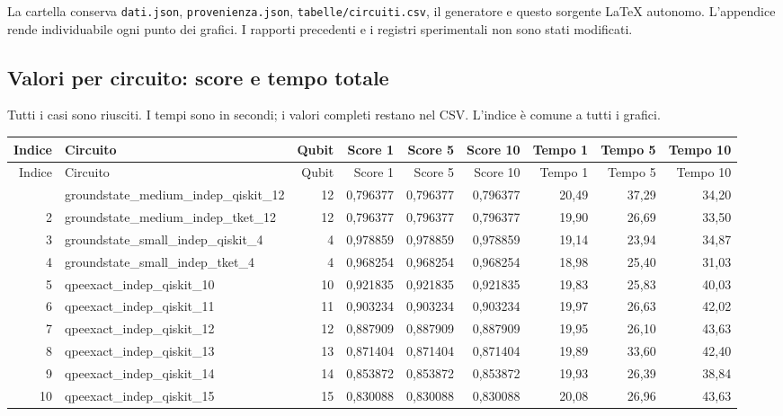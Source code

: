 \documentclass[a4paper,10pt]{article}
\begin{document}
La cartella conserva \texttt{dati.json}, \texttt{provenienza.json},
\texttt{tabelle/circuiti.csv}, il generatore e questo sorgente LaTeX autonomo.
L'appendice rende individuabile ogni punto dei grafici. I rapporti precedenti
e i registri sperimentali non sono stati modificati.
\clearpage\appendix\begin{landscape}\section{Valori per circuito: score e tempo totale}
Tutti i casi sono riusciti. I tempi sono in secondi; i valori completi restano nel CSV. L'indice è comune a tutti i grafici.\par\begingroup\footnotesize\setlength{\tabcolsep}{4pt}\renewcommand{\arraystretch}{1.16}\begin{longtable}{r l r rrr rrr}\toprule Indice & Circuito & Qubit & Score 1 & Score 5 & Score 10 & Tempo 1 & Tempo 5 & Tempo 10\\\midrule\endfirsthead\toprule Indice & Circuito & Qubit & Score 1 & Score 5 & Score 10 & Tempo 1 & Tempo 5 & Tempo 10\\\midrule\endhead\bottomrule\endfoot
1 & groundstate\_medium\_indep\_qiskit\_12 & 12 & 0,796377 & 0,796377 & 0,796377 & 20,49 & 37,29 & 34,20\\
2 & groundstate\_medium\_indep\_tket\_12 & 12 & 0,796377 & 0,796377 & 0,796377 & 19,90 & 26,69 & 33,50\\
3 & groundstate\_small\_indep\_qiskit\_4 & 4 & 0,978859 & 0,978859 & 0,978859 & 19,14 & 23,94 & 34,87\\
4 & groundstate\_small\_indep\_tket\_4 & 4 & 0,968254 & 0,968254 & 0,968254 & 18,98 & 25,40 & 31,03\\
5 & qpeexact\_indep\_qiskit\_10 & 10 & 0,921835 & 0,921835 & 0,921835 & 19,83 & 25,83 & 40,03\\
6 & qpeexact\_indep\_qiskit\_11 & 11 & 0,903234 & 0,903234 & 0,903234 & 19,97 & 26,63 & 42,02\\
7 & qpeexact\_indep\_qiskit\_12 & 12 & 0,887909 & 0,887909 & 0,887909 & 19,95 & 26,10 & 43,63\\
8 & qpeexact\_indep\_qiskit\_13 & 13 & 0,871404 & 0,871404 & 0,871404 & 19,89 & 33,60 & 42,40\\
9 & qpeexact\_indep\_qiskit\_14 & 14 & 0,853872 & 0,853872 & 0,853872 & 19,93 & 26,39 & 38,84\\
10 & qpeexact\_indep\_qiskit\_15 & 15 & 0,830088 & 0,830088 & 0,830088 & 20,08 & 26,96 & 43,63\\

\end{longtable}
\end{landscape}
\end{document}
